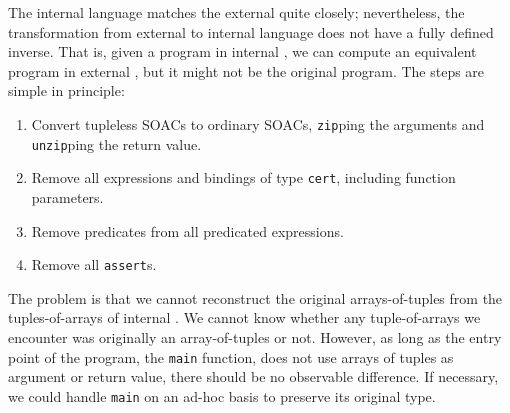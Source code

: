 The internal language matches the external quite closely;
nevertheless, the transformation from external to internal language
does not have a fully defined inverse.  That is, given a program in
internal \LO{}, we can compute an equivalent program in external
\LO{}, but it might not be the original program.  The steps are simple
in principle:

\begin{enumerate}
\item Convert tupleless SOACs to ordinary SOACs, \texttt{zip}ping the
  arguments and \texttt{unzip}ping the return value.

\item Remove all expressions and bindings of type \texttt{cert},
  including function parameters.

\item Remove predicates from all predicated expressions.

\item Remove all \texttt{assert}s.
\end{enumerate}

The problem is that we cannot reconstruct the original
arrays-of-tuples from the tuples-of-arrays of internal \LO{}.  We
cannot know whether any tuple-of-arrays we encounter was originally an
array-of-tuples or not.  However, as long as the entry point of the
program, the \texttt{main} function, does not use arrays of tuples as
argument or return value, there should be no observable difference.
If necessary, we could handle \texttt{main} on an ad-hoc basis to
preserve its original type.

